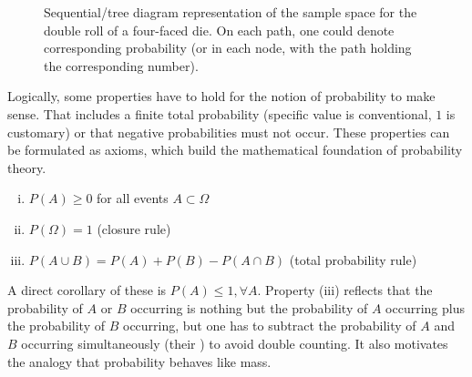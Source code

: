 \begin{figure}
\caption{Sequential/tree diagram representation of the sample space for the double roll of a four-faced die. On each path, one could denote corresponding probability (or in each node, with the path holding the corresponding number).}
\label{fig:sequ_diagram_die}




\iffalse
{
\begin{forest}
  for tree={grow=0,l=3cm,parent anchor=west,anchor=south,child anchor=west, s sep+=10pt}
    [{}, name=t0%
      [for tree={grow=0,l=3cm,parent anchor=west,anchor=west,child anchor=west, s sep+=10pt}
          [{1}]
      ]
      [{$(2, 2)$}, name=t1
        [{$(1,1)$}]
        [{$(4,4)$}, name=t2]
      ]
    ]
\end{forest}
}
\fi
\end{figure}



Logically, some properties have to hold for the notion of probability to make sense. That includes a finite total probability (specific value is conventional, $1$ is customary) or that negative probabilities must not occur. These properties can be formulated as axioms, which build the mathematical foundation of probability theory.
\begin{prop}
\begin{enumerate}[(i)]
\item $P(A) \geq 0$ for all events $A \subset \Omega$

\item $P(\Omega) = 1$ (closure rule)

\item $P(A \cup B) = P(A) + P(B) - P(A \cap B)$ (total probability rule)
\end{enumerate}
\end{prop}
A direct corollary of these is $P(A) \leq 1, \forall A$. Property (iii) reflects that the probability of $A$ or $B$ occurring is nothing but the probability of $A$ occurring plus the probability of $B$ occurring, but one has to subtract the probability of $A$ and $B$ occurring simultaneously (their ) to avoid double counting. It also motivates the analogy that probability behaves like mass.\\


